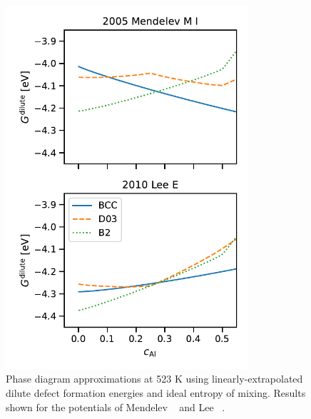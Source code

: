 \begin{figure}[h]
    \label{fig:0K_dilute_phases}
    \centering
    \includegraphics[width=0.8\textwidth]{figures/zerok_phases_dilute_point_defects}
    \caption{Phase diagram approximations at 523 K using linearly-extrapolated dilute defect formation energies and ideal entropy of mixing. Results shown for the potentials of Mendelev \etal~\cite{mendelev2005effect} and Lee \etal~\cite{lee2010modified}.}
\end{figure}
%

